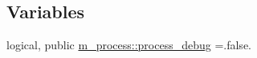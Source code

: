 \subsection*{Variables}
\begin{DoxyCompactItemize}
\item 
logical, public \mbox{\hyperlink{namespacem__process_a0fabee8d01338d5523fbdea5c5f1e894}{m\+\_\+process\+::process\+\_\+debug}} =.false.
\end{DoxyCompactItemize}
